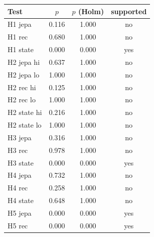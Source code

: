\begin{tabular}{lccc}
\toprule
Test & $p$ & $p$ (Holm) & supported\\
\midrule
H1 jepa & 0.116 & 1.000 & no\\
H1 rec & 0.680 & 1.000 & no\\
H1 state & 0.000 & 0.000 & yes\\
H2 jepa hi & 0.637 & 1.000 & no\\
H2 jepa lo & 1.000 & 1.000 & no\\
H2 rec hi & 0.125 & 1.000 & no\\
H2 rec lo & 1.000 & 1.000 & no\\
H2 state hi & 0.216 & 1.000 & no\\
H2 state lo & 1.000 & 1.000 & no\\
H3 jepa & 0.316 & 1.000 & no\\
H3 rec & 0.978 & 1.000 & no\\
H3 state & 0.000 & 0.000 & yes\\
H4 jepa & 0.732 & 1.000 & no\\
H4 rec & 0.258 & 1.000 & no\\
H4 state & 0.648 & 1.000 & no\\
H5 jepa & 0.000 & 0.000 & yes\\
H5 rec & 0.000 & 0.000 & yes\\
\bottomrule
\end{tabular}
